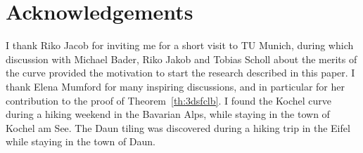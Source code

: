 \documentclass[11pt,a4paper]{article}
\newcommand{\ARRWW}{\xspace}
\begin{document}
\section*{Acknowledgements}
I thank Riko Jacob for inviting me for a short visit to TU Munich, during which discussion with Michael Bader, Riko Jakob and Tobias Scholl about the merits of the \ARRWW curve provided the motivation to start the research described in this paper. I thank Elena Mumford for many inspiring discussions, and in particular for her contribution to the proof of Theorem~\ref{th:3dsfclb}. I found the Kochel curve during a hiking weekend in the Bavarian Alps, while staying in the town of Kochel am See. The Daun tiling was discovered during a hiking trip in the Eifel while staying in the town of Daun.


\end{document}
